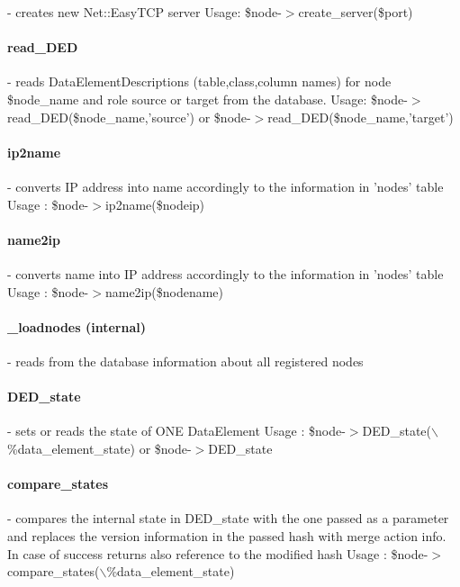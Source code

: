 - creates new Net::EasyTCP server
Usage: \$node-$>$create\_server(\$port)

\paragraph*{read\_DED\label{read_DED}}


- reads DataElementDescriptions (table,class,column names) for node \$node\_name and role source or target from the database.
Usage: \$node-$>$read\_DED(\$node\_name,'source') or  \$node-$>$read\_DED(\$node\_name,'target')

\paragraph*{ip2name\label{ip2name}}


- converts IP address into name accordingly to the information in 'nodes' table
Usage : \$node-$>$ip2name(\$nodeip)

\paragraph*{name2ip\label{name2ip}}


- converts name into IP address accordingly to the information in 'nodes' table
Usage : \$node-$>$name2ip(\$nodename)

\paragraph*{\_loadnodes (internal)\label{_loadnodes_internal_}}


- reads from the database information about all registered nodes

\paragraph*{DED\_state\label{DED_state}}


- sets or reads the state of ONE DataElement
Usage : \$node-$>$DED\_state($\backslash$\%data\_element\_state) or \$node-$>$DED\_state

\paragraph*{compare\_states\label{compare_states}}


- compares the internal state in DED\_state with the one passed as a parameter and replaces the version information in the passed hash with merge action info. In case of success returns also reference to the modified hash
Usage : \$node-$>$compare\_states($\backslash$\%data\_element\_state)

